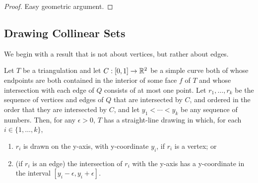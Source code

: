 \documentclass{patmorin}
\begin{document}
\begin{proof}
  Easy geometric argument.
\end{proof}

\subsection{Drawing Collinear Sets}

We begin with a result that is not about vertices, but rather about edges.

\begin{thm}
   Let $T$ be a triangulation and let $C:[0,1]\to\mathbb{R}^2$ be a simple curve
   both of whose endpoints are both contained in the interior of some
   face $f$ of $T$ and whose intersection with each edge of $Q$ consists
   of at most one point. Let $r_1,\ldots,r_k$ be the sequence of
   vertices and edges of $Q$ that are intersected by $C$, and ordered in
   the order that they are intersected by $C$, and let $y_1<\cdots<y_k$
   be any sequence of numbers.  Then, for any $\epsilon>0$, $T$ has a
   straight-line drawing in which,
   for each $i\in\{1,\ldots,k\}$, 
   \begin{enumerate}
       \item $r_i$ is drawn on the y-axis, with y-coordinate $y_i$,
         if $r_i$ is a vertex; or
       \item (if $r_i$ is an edge) the intersection of $r_i$ with the
         y-axis has a y-coordinate in the interval
         $[y_i-\epsilon,y_i+\epsilon]$.
   \end{enumerate}
\end{thm}
\end{document}
